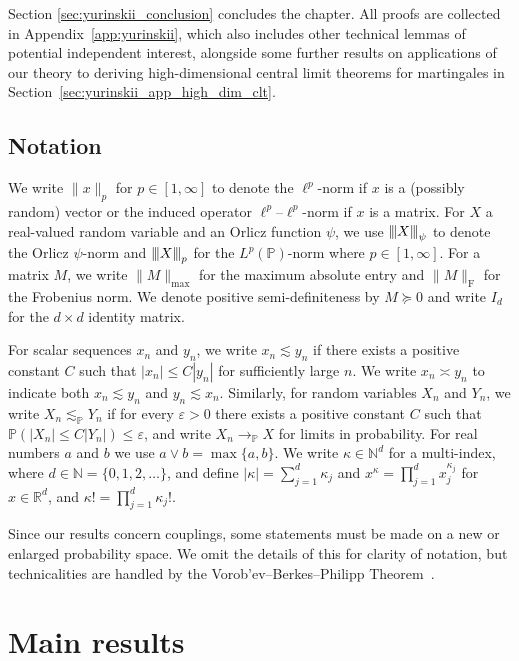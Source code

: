 \documentclass[11pt,lof]{puthesis}
\renewcommand{\P}{\ensuremath{\mathbb{P}}}
\newcommand{\N}{\ensuremath{\mathbb{N}}}
\newcommand{\R}{\ensuremath{\mathbb{R}}}
\newcommand{\rF}{\ensuremath{\mathrm{F}}}
\newcommand{\vvvert}{{\vert\kern-0.25ex\vert\kern-0.25ex\vert}}
\theoremstyle{break}
\theoremstyle{proof}
\begin{document}
Section \ref{sec:yurinskii_conclusion} concludes the chapter.
All proofs are collected in
Appendix~\ref{app:yurinskii}, which also includes other technical lemmas
of potential independent interest, alongside some further results on
applications of our theory to deriving high-dimensional central limit theorems
for martingales in Section~\ref{sec:yurinskii_app_high_dim_clt}.

\subsection{Notation}

We write $\|x\|_p$ for $p\in[1,\infty]$ to denote the $\ell^p$-norm if $x$ is a
(possibly random) vector or the induced operator $\ell^p$--$\ell^p$-norm if $x$
is a matrix. For $X$ a real-valued random variable and an Orlicz function
$\psi$, we use $\vvvert X \vvvert_\psi$ to denote the Orlicz $\psi$-norm
\citep[Section~2.2]{van1996weak} and $\vvvert X \vvvert_p$
for the $L^p(\P)$-norm where
$p\in [1,\infty]$. For a matrix $M$, we write $\|M\|_{\max}$ for the
maximum absolute entry and $\|M\|_\rF$ for the Frobenius norm. We denote
positive semi-definiteness by $M \succeq 0$ and write $I_d$ for the $d \times
d$ identity matrix.

For scalar sequences $x_n$ and $y_n$, we write $x_n \lesssim y_n$ if there
exists a positive constant $C$ such that $|x_n| \leq C |y_n|$ for sufficiently
large $n$. We write $x_n \asymp y_n$ to indicate both $x_n \lesssim y_n$ and
$y_n \lesssim x_n$. Similarly, for random variables $X_n$ and $Y_n$, we write
$X_n \lesssim_\P Y_n$ if for every $\varepsilon > 0$ there exists a positive
constant $C$ such that $\P(|X_n| \leq C |Y_n|) \leq \varepsilon$, and write
$X_n \to_\P X$ for limits in probability. For real numbers $a$ and $b$ we use
$a \vee b = \max\{a,b\}$. We write $\kappa \in \N^d$ for a multi-index, where
$d \in \N = \{0, 1, 2, \ldots\}$, and define $|\kappa| = \sum_{j=1}^d \kappa_j$
and $x^\kappa = \prod_{j=1}^d x_j^{\kappa_j}$ for $x \in \R^d$,
and $\kappa! = \prod_{j=1}^{d} \kappa_j !$.

Since our results concern couplings, some statements must be made on a new or
enlarged probability space. We omit the details of this for clarity of
notation, but technicalities are handled by the Vorob'ev--Berkes--Philipp
Theorem~\citep[Theorem~1.1.10]{dudley1999uniform}.

\section{Main results}
\label{sec:yurinskii_main_results}
\end{document}
